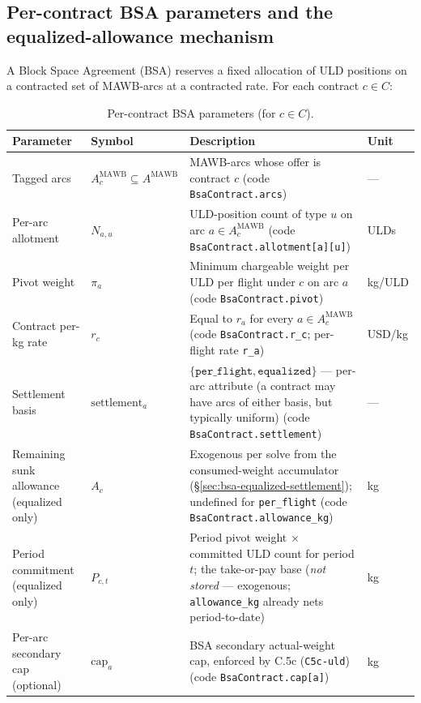 \documentclass[11pt,a4paper]{article}
\theoremstyle{definition}
\begin{document}
\subsection{Per-contract BSA parameters and the equalized-allowance mechanism}
\label{sec:bsa-params}

A Block Space Agreement (BSA) reserves a fixed allocation of ULD positions on
a contracted set of MAWB-arcs at a contracted rate. For each contract $c \in
C$:

\begin{table}[H]
\centering
\caption{Per-contract BSA parameters (for $c \in C$).}
\label{tab:bsa-params}
\begin{tabular}{p{3.5cm}p{2.2cm}p{6.5cm}p{1.5cm}}
\toprule
Parameter & Symbol & Description & Unit \\
\midrule
Tagged arcs & $A_c^{\text{MAWB}} \subseteq A^{\text{MAWB}}$ & MAWB-arcs whose offer is contract $c$ (code \texttt{BsaContract.arcs}) & --- \\
Per-arc allotment & $N_{a,u}$ & ULD-position count of type $u$ on arc $a \in A_c^{\text{MAWB}}$ (code \texttt{BsaContract.allotment[a][u]}) & ULDs \\
Pivot weight & $\pi_a$ & Minimum chargeable weight per ULD per flight under $c$ on arc $a$ (code \texttt{BsaContract.pivot}) & kg/ULD \\
Contract per-kg rate & $r_c$ & Equal to $r_a$ for every $a \in A_c^{\text{MAWB}}$ (code \texttt{BsaContract.r\_c}; per-flight rate \texttt{r\_a}) & USD/kg \\
Settlement basis & $\text{settlement}_a$ & $\{\texttt{per\_flight}, \texttt{equalized}\}$ --- per-arc attribute (a contract may have arcs of either basis, but typically uniform) (code \texttt{BsaContract.settlement}) & --- \\
Remaining sunk allowance (equalized only) & $A_c$ & Exogenous per solve from the consumed-weight accumulator (\S\ref{sec:bsa-equalized-settlement}); undefined for \texttt{per\_flight} (code \texttt{BsaContract.allowance\_kg}) & kg \\
Period commitment (equalized only) & $P_{c,t}$ & Period pivot weight $\times$ committed ULD count for period $t$; the take-or-pay base (\emph{not stored} --- exogenous; \texttt{allowance\_kg} already nets period-to-date) & kg \\
Per-arc secondary cap (optional) & $\text{cap}_a$ & BSA secondary actual-weight cap, enforced by C.5c (\texttt{C5c-uld}) (code \texttt{BsaContract.cap[a]}) & kg \\
\bottomrule
\end{tabular}
\end{table}
\end{document}
